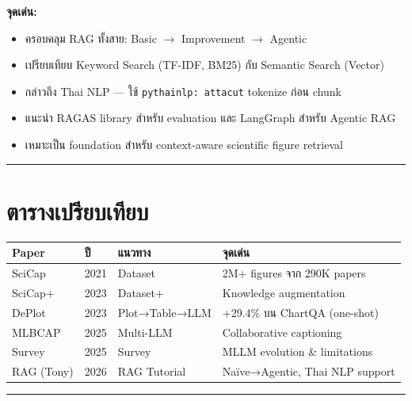 \documentclass[11pt,a4paper]{article}
\begin{document}
\vspace{6pt}
\noindent\textbf{จุดเด่น:}
\begin{itemize}[nosep, leftmargin=2em]
  \item ครอบคลุม RAG ทั้งสาย: Basic $\to$ Improvement $\to$ Agentic
  \item เปรียบเทียบ Keyword Search (TF-IDF, BM25) กับ Semantic Search (Vector)
  \item กล่าวถึง Thai NLP — ใช้ \texttt{pythainlp: attacut} tokenize ก่อน chunk
  \item แนะนำ RAGAS library สำหรับ evaluation และ LangGraph สำหรับ Agentic RAG
  \item เหมาะเป็น foundation สำหรับ context-aware scientific figure retrieval
\end{itemize}

\vspace{16pt}
\noindent\rule{\textwidth}{1.5pt}

\section*{ตารางเปรียบเทียบ}

\vspace{8pt}
\noindent
\begin{tabular}{@{}lllp{5.5cm}@{}}
  \toprule
  \textbf{Paper} & \textbf{ปี} & \textbf{แนวทาง} & \textbf{จุดเด่น} \\
  \midrule
  SciCap     & 2021 & Dataset        & 2M+ figures จาก 290K papers \\
  SciCap+    & 2023 & Dataset+       & Knowledge augmentation \\
  DePlot     & 2023 & Plot→Table→LLM & +29.4\% บน ChartQA (one-shot) \\
  MLBCAP     & 2025 & Multi-LLM      & Collaborative captioning \\
  Survey     & 2025 & Survey         & MLLM evolution \& limitations \\
  RAG (Tony) & 2026 & RAG Tutorial   & Naïve→Agentic, Thai NLP support \\
  \bottomrule
\end{tabular}

\vspace{16pt}
\noindent\rule{\textwidth}{1.5pt}
\vspace{6pt}

\end{document}
